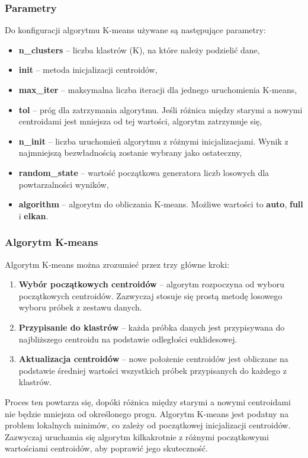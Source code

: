 		\subsubsection{Parametry}
		Do konfiguracji algorytmu K-means używane są następujące parametry:
		\begin{itemize}
			\item \textbf{n\_clusters} -- liczba klastrów (K), na które należy podzielić dane,
			\item \textbf{init} -- metoda inicjalizacji centroidów,
			\item \textbf{max\_iter} --  maksymalna liczba iteracji dla jednego uruchomienia K-means,
			\item \textbf{tol} -- próg dla zatrzymania algorytmu. Jeśli różnica między starymi a nowymi centroidami jest mniejsza od tej wartości, algorytm zatrzymuje się,
			\item \textbf{n\_init} -- liczba uruchomień algorytmu z różnymi inicjalizacjami. Wynik z najmniejszą bezwładnością zostanie wybrany jako ostateczny,
			\item \textbf{random\_state} --  wartość początkowa generatora liczb losowych dla powtarzalności wyników,
			\item \textbf{algorithm} -- algorytm do obliczania K-means. Możliwe wartości to \textbf{auto}, \textbf{full} i \textbf{elkan}.
		\end{itemize}
	
	
		\subsubsection{Algorytm K-means}
			Algorytm K-means można zrozumieć przez trzy główne kroki:
			
			\begin{enumerate}
				\item \textbf{Wybór początkowych centroidów} -- algorytm rozpoczyna od wyboru początkowych centroidów. Zazwyczaj stosuje się prostą metodę losowego wyboru próbek z zestawu danych.
				\item \textbf{Przypisanie do klastrów} -- każda próbka danych jest przypisywana do najbliższego centroidu na podstawie odległości euklidesowej.
				\item \textbf{Aktualizacja centroidów} -- nowe położenie centroidów jest obliczane na podstawie średniej wartości wszystkich próbek przypisanych do każdego z klastrów.
			\end{enumerate}
			
			Proces ten powtarza się, dopóki różnica między starymi a nowymi centroidami nie będzie mniejsza od określonego progu. Algorytm K-means jest podatny na problem lokalnych minimów, co zależy od początkowej inicjalizacji centroidów. Zazwyczaj uruchamia się algorytm kilkakrotnie z różnymi początkowymi wartościami centroidów, aby poprawić jego skuteczność.
			
